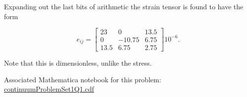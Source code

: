 {Expanding out the last bits of arithmetic the strain tensor is found to have the form

\begin{equation}\label{eqn:continuumProblemSet1:230}
e_{ij}
=
\begin{bmatrix}
 23 & 0 & 13.5 \\
 0 & -10.75 & 6.75 \\
 13.5 & 6.75 & 2.75
\end{bmatrix}
 10^{-6}.
\end{equation}

Note that this is dimensionless, unlike the stress.

Associated Mathematica notebook for this problem:
\href{https://raw.github.com/peeterjoot/physicsplay/master/notes/phy454/mathematica/continuumProblemSet1Q1.cdf}{continuumProblemSet1Q1.cdf}
} %


